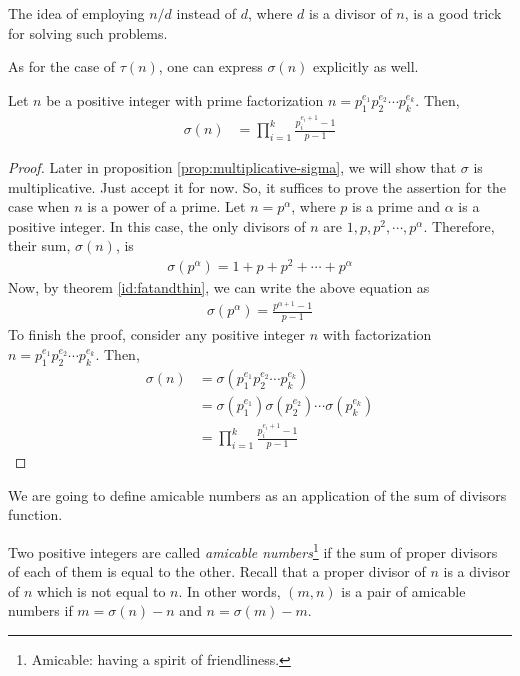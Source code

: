 	\begin{note}
		The idea of employing $n/d$ instead of $d$, where $d$ is a divisor of $n$, is a good trick for solving such problems.
	\end{note}

As for the case of $\tau(n)$, one can express $\sigma(n)$ explicitly as well.

	\begin{theorem} \label{thm:sigmaformula}
		Let $n$ be a positive integer with prime factorization $n=p_1^{e_1}p_2^{e_2}\cdots p_k^{e_k}$. Then,
		\begin{align*}
		\sigma(n) &= \prod_{i=1}^{k} \frac{p_i^{e_i+1}-1}{p-1}
		\end{align*}
	\end{theorem}

	\begin{proof}
		Later in proposition \ref{prop:multiplicative-sigma}, we will show that $\sigma$ is multiplicative. Just accept it for now. So, it suffices to prove the assertion for the case when $n$ is a power of a prime. Let $n=p^\alpha$, where $p$ is a prime and $\alpha$ is a positive integer. In this case, the only divisors of $n$ are $1, p, p^2, \cdots, p^\alpha$. Therefore, their sum, $\sigma(n)$, is
			\begin{align*}
				\sigma(p^\alpha) = 1+p+p^2+\cdots+p^\alpha
			\end{align*}
		Now, by theorem \autoref{id:fatandthin}, we can write the above equation as
			\begin{align*}
				\sigma(p^\alpha) = \frac{p^{\alpha+1} - 1}{p-1}
			\end{align*}
		To finish the proof, consider any positive integer $n$ with factorization $n=p_1^{e_1}p_2^{e_2}\cdots p_k^{e_k}$. Then,
		\begin{align*}
		\sigma(n) &=  \sigma(p_1^{e_1}p_2^{e_2}\cdots p_k^{e_k})\\
		&= \sigma(p_1^{e_1}) \sigma(p_2^{e_2}) \cdots \sigma(p_k^{e_k})\\
		&= \prod_{i=1}^{k} \frac{p_i^{e_i+1}-1}{p-1}
		\end{align*}
	\end{proof}

We are going to define amicable numbers as an application of the sum of divisors function.

\begin{definition}\label{key}
	Two positive integers are called \textit{amicable numbers}\footnote{Amicable: having a spirit of friendliness.} if the sum of proper divisors of each of them is equal to the other. Recall that a proper divisor of $n$ is a divisor of $n$ which is not equal to $n$. In other words, $(m,n)$ is a pair of amicable numbers if $m=\sigma(n)-n$ and $n=\sigma(m)-m$.
\end{definition}


